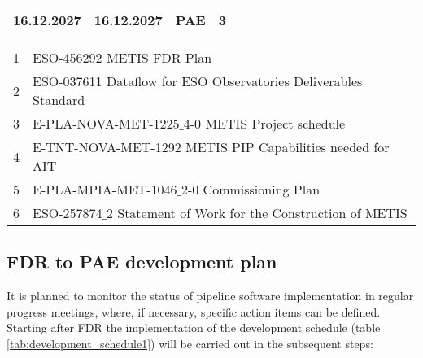 \begin{table}[h!]
\begin{tabularx}{\textwidth}{llll}
\hline
16.12.2027 & 16.12.2027 & PAE							                      &	3 \\
\hline\hline
\end{tabularx}			
\tiny
\begin{tabularx}{\textwidth}{ll}
1 & ESO-456292 METIS FDR Plan  \\
2 & ESO-037611 Dataflow for ESO Observatories Deliverables Standard \\
3 & E-PLA-NOVA-MET-1225$\_$4-0 METIS Project schedule \\
4 & E-TNT-NOVA-MET-1292 METIS PIP Capabilities needed for AIT \\ 
5 & E-PLA-MPIA-MET-1046$\_$2-0 Commissioning Plan \\
6 & ESO-257874$\_$2 Statement of Work for the Construction of METIS \\
\end{tabularx} 
\end{table}


\subsection{FDR to PAE development plan}
\label{ssec:fdr2pae}

It is planned to monitor the status of pipeline software implementation in regular progress meetings, where, if necessary, specific action items can be defined. Starting after FDR the implementation of the development schedule (table \ref{tab:development_schedule1}) will be carried out in the subsequent steps:

